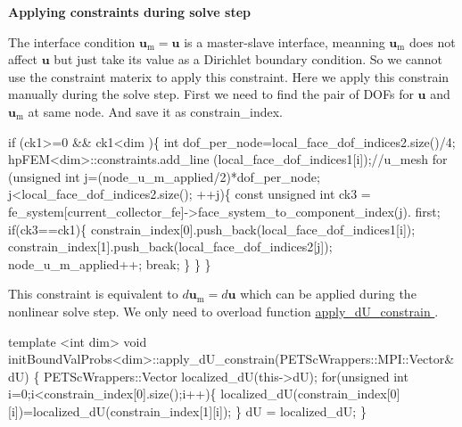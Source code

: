 {\bfseries Applying constraints during solve step}\par
 The interface condition $\boldsymbol{u}_\text{m}=\boldsymbol{u}$ is a master-\/slave interface, meanning $\boldsymbol{u}_\text{m}$ does not affect $\boldsymbol{u}$ but just take its value as a Dirichlet boundary condition. So we cannot use the constraint materix to apply this constraint. Here we apply this constrain manually during the solve step. First we need to find the pair of D\-O\-Fs for $\boldsymbol{u}$ and $\boldsymbol{u}_\text{m}$ at same node. And save it as constrain\-\_\-index. 
\begin{DoxyCode}
\textcolor{keywordflow}{if} (ck1>=0 && ck1<dim )\{
        \textcolor{keywordtype}{int} dof\_per\_node=local\_face\_dof\_indices2.size()/4;
        hpFEM<dim>::constraints.add\_line (local\_face\_dof\_indices1[i]);\textcolor{comment}{//u\_mesh                             
                               }
        \textcolor{keywordflow}{for} (\textcolor{keywordtype}{unsigned} \textcolor{keywordtype}{int} j=(node\_u\_m\_applied/2)*dof\_per\_node; j<local\_face\_dof\_indices2.size(); ++j)\{
            \textcolor{keyword}{const} \textcolor{keywordtype}{unsigned} \textcolor{keywordtype}{int} ck3 = fe\_system[current\_collector\_fe]->face\_system\_to\_component\_index(j).
      first;
            \textcolor{keywordflow}{if}(ck3==ck1)\{
                constrain\_index[0].push\_back(local\_face\_dof\_indices1[i]);
                constrain\_index[1].push\_back(local\_face\_dof\_indices2[j]);
                node\_u\_m\_applied++;
                \textcolor{keywordflow}{break};
            \}
        \}                       
    \}   
\end{DoxyCode}
 This constraint is equivalent to $d\boldsymbol{u}_\text{m}=d\boldsymbol{u}$ which can be applied during the nonlinear solve step. We only need to overload function \hyperlink{classsolve_class_a029ece57f667fa697cb29eb482eff31b}{apply\-\_\-d\-U\-\_\-constrain }. 
\begin{DoxyCode}
\textcolor{keyword}{template} <\textcolor{keywordtype}{int} dim>
\textcolor{keywordtype}{void} initBoundValProbs<dim>::apply\_dU\_constrain(PETScWrappers::MPI::Vector& dU)
\{
    PETScWrappers::Vector localized\_dU(this->dU);   
  \textcolor{keywordflow}{for}(\textcolor{keywordtype}{unsigned} \textcolor{keywordtype}{int} i=0;i<constrain\_index[0].size();i++)\{
        localized\_dU(constrain\_index[0][i])=localized\_dU(constrain\_index[1][i]);
    \}
    dU = localized\_dU;
\}
\end{DoxyCode}
